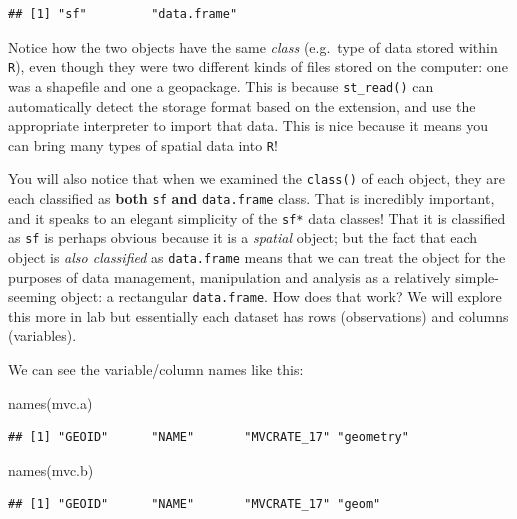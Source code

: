 \documentclass[
]{book}
\newenvironment{Shaded}{\begin{snugshade}}{\end{snugshade}}
\newcommand{\FunctionTok}[1]{\textcolor[rgb]{0.00,0.00,0.00}{#1}}
\newcommand{\NormalTok}[1]{#1}
\begin{document}
\begin{verbatim}
## [1] "sf"         "data.frame"
\end{verbatim}

Notice how the two objects have the same \emph{class} (e.g.~type of data stored within \texttt{R}), even though they were two different kinds of files stored on the computer: one was a shapefile and one a geopackage. This is because \texttt{st\_read()} can automatically detect the storage format based on the extension, and use the appropriate interpreter to import that data. This is nice because it means you can bring many types of spatial data into \texttt{R}!

You will also notice that when we examined the \texttt{class()} of each object, they are each classified as \textbf{both} \texttt{sf} \textbf{and} \texttt{data.frame} class. That is incredibly important, and it speaks to an elegant simplicity of the \texttt{sf*} data classes! That it is classified as \texttt{sf} is perhaps obvious because it is a \emph{spatial} object; but the fact that each object is \emph{also classified} as \texttt{data.frame} means that we can treat the object for the purposes of data management, manipulation and analysis as a relatively simple-seeming object: a rectangular \texttt{data.frame}. How does that work? We will explore this more in lab but essentially each dataset has rows (observations) and columns (variables).

We can see the variable/column names like this:

\begin{Shaded}
\begin{Highlighting}[]
\FunctionTok{names}\NormalTok{(mvc.a)}
\end{Highlighting}
\end{Shaded}

\begin{verbatim}
## [1] "GEOID"      "NAME"       "MVCRATE_17" "geometry"
\end{verbatim}

\begin{Shaded}
\begin{Highlighting}[]
\FunctionTok{names}\NormalTok{(mvc.b)}
\end{Highlighting}
\end{Shaded}

\begin{verbatim}
## [1] "GEOID"      "NAME"       "MVCRATE_17" "geom"
\end{verbatim}
\end{document}
